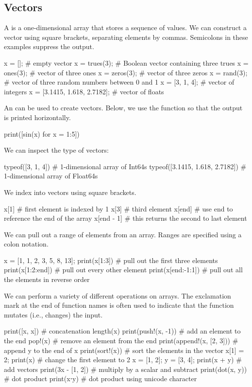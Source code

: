 \subsection{Vectors}

A  is a one-dimensional array that stores a sequence of values.
We can construct a vector using square brackets, separating elements by commas.
Semicolons in these examples suppress the output.
\begin{juliaconsole}
x = [];                      # empty vector
x = trues(3);                # Boolean vector containing three trues
x = ones(3);                 # vector of three ones
x = zeros(3);                # vector of three zeros
x = rand(3);                 # vector of three random numbers between 0 and 1
x = [3, 1, 4];               # vector of integers
x = [3.1415, 1.618, 2.7182]; # vector of floats
\end{juliaconsole}
An  can be used to create vectors. Below, we use the  function so that the output is printed horizontally.
\begin{juliaconsole}
print([sin(x) for x = 1:5])
\end{juliaconsole}

We can inspect the type of vectors:
\begin{juliaconsole}
typeof([3, 1, 4])               # 1-dimensional array of Int64s
typeof([3.1415, 1.618, 2.7182]) # 1-dimensional array of Float64s
\end{juliaconsole}

We index into vectors using square brackets.
\begin{juliaconsole}
x[1]       # first element is indexed by 1
x[3]       # third element
x[end]     # use end to reference the end of the array
x[end - 1] # this returns the second to last element
\end{juliaconsole}

We can pull out a range of elements from an array. Ranges are specified using a colon notation.
\begin{juliaconsole}
x = [1, 1, 2, 3, 5, 8, 13];
print(x[1:3])      # pull out the first three elements
print(x[1:2:end])  # pull out every other element
print(x[end:-1:1]) # pull out all the elements in reverse order
\end{juliaconsole}

We can perform a variety of different operations on arrays. The exclamation mark at the end of function names is often used to indicate that the function mutates (i.e., changes) the input.
\begin{juliaconsole}
print([x, x])             # concatenation
length(x)
print(push!(x, -1))       # add an element to the end
pop!(x)                   # remove an element from the end
print(append!(x, [2, 3])) # append y to the end of x
print(sort!(x))           # sort the elements in the vector
x[1] = 2; print(x)        # change the first element to 2
x = [1, 2];
y = [3, 4];
print(x + y)              # add vectors
print(3x - [1, 2])        # multiply by a scalar and subtract
print(dot(x, y))          # dot product
print(x⋅y)                # dot product using unicode character
\end{juliaconsole}

